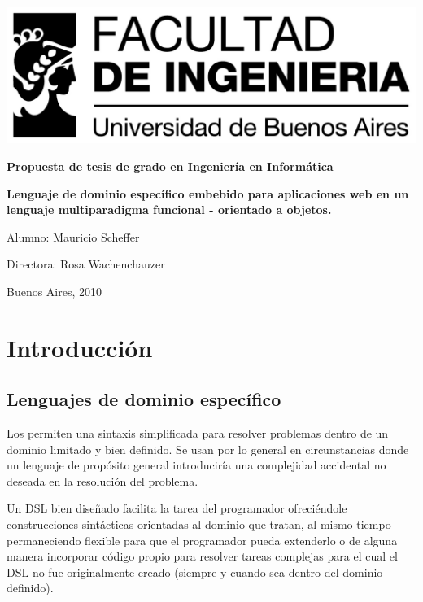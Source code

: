 \documentclass[12pt]{article}
\begin{document}
\thispagestyle{empty}

\begin {center}

\includegraphics[scale=1]{logo_fiuba_alta.jpg}


\vspace{3cm}

\textbf{\Large Propuesta de tesis de grado en Ingeniería en Informática}

\vspace{3cm}

\textbf{\Large Lenguaje de dominio específico embebido para aplicaciones web en un lenguaje multiparadigma funcional - orientado a objetos.}

\vspace{2cm}

\end {center}
\vspace{3cm}

Alumno: Mauricio Scheffer

Directora: Rosa Wachenchauzer

Buenos Aires, 2010

\newpage

\section{Introducción}

\subsection{Lenguajes de dominio específico}

Los  permiten una sintaxis simplificada para resolver problemas dentro de un dominio limitado y bien definido. Se usan por lo general en circunstancias donde un lenguaje de propósito general introduciría una complejidad accidental no deseada en la resolución del problema. 

Un DSL bien diseñado facilita la tarea del programador ofreciéndole construcciones sintácticas orientadas al dominio que tratan, al mismo tiempo permaneciendo flexible para que el programador pueda extenderlo o de alguna manera incorporar código propio para resolver tareas complejas para el cual el DSL no fue originalmente creado (siempre y cuando sea dentro del dominio definido).
\end{document}
